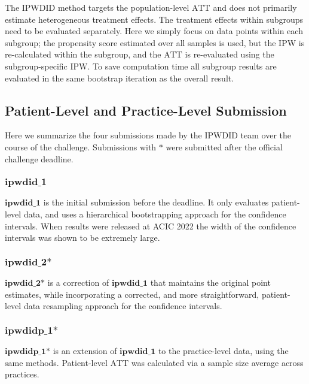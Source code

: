 \documentclass[twoside,11pt]{article}
\newcommand*{\IPW}{\ensuremath{\text{IPW}}\xspace}
\newcommand*{\IPWDID}{\ensuremath{\text{IPWDID}}\xspace}
\newcommand*{\ATT}{\ensuremath{\text{ATT}}\xspace}
\newcommand{\modelStyle}[1]{\ensuremath{\textbf{#1}}\xspace}
\newcommand*{\ipwdid}{\modelStyle{ipwdid\_1}}
\newcommand*{\ipwdidStar}{\modelStyle{ipwdid\_2*}}
\newcommand*{\ipwdidP}{\modelStyle{ipwdidp\_1*}}
\begin{document}
The \IPWDID method targets the population-level \ATT
and does not primarily estimate heterogeneous treatment effects.
The treatment effects within subgroups need to be evaluated separately.
Here we simply focus on data points within each subgroup;
the propensity score estimated over all samples is used,
but the \IPW is re-calculated within the subgroup,
and the \ATT is re-evaluated using the subgroup-specific \IPW.
To save computation time all subgroup results are
evaluated in the same bootstrap iteration as the overall result.

\subsection{Patient-Level and Practice-Level Submission}
\label{method:submissions}

Here we summarize the four submissions made by the \IPWDID team over the course of the challenge.
Submissions with \modelStyle{*} were submitted after the official challenge deadline.

\subsubsection{\ipwdid}

\ipwdid is the initial submission before the deadline.
It only evaluates patient-level data,
and uses a hierarchical bootstrapping approach for the confidence intervals.
When results were released at ACIC 2022 the width of the confidence intervals was shown to be extremely large.

\subsubsection{\ipwdidStar}

\ipwdidStar is a correction of \ipwdid that maintains the original point estimates,
while incorporating a corrected, and more straightforward, patient-level data resampling approach for the confidence intervals.

\subsubsection{\ipwdidP}

\ipwdidP is an extension of \ipwdid to the practice-level data, using the same methods.
Patient-level \ATT was calculated via a sample size average across practices.
\end{document}
